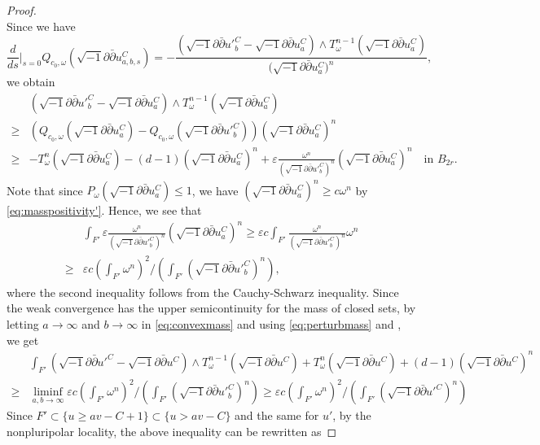 \documentclass{amsart}
\numberwithin{equation}{section}
\theoremstyle{plain}
\theoremstyle{definition}
\theoremstyle{remark}
\newcommand{\delb}{\sqrt{-1}\partial\bar{\partial}}
\begin{document}
\begin{proof}
\begin{equation*}
    \end{equation*}
    Since we have
    $$\frac{d}{ds}\Bigg\vert_{s=0} Q_{c_0,\omega}(\delb u^C_{a,b,s})=-\frac{(\delb u'^C_b-\delb u^C_a)\wedge T^{n-1}_\omega(\delb u^C_a)}{\big(\delb u^C_a\big)^n},$$
    we obtain
    \begin{equation}\label{eq:convexmass}
        \begin{aligned}
            &\left(\delb u'^C_b-\delb u^C_a\right)\wedge T^{n-1}_\omega(\delb u^C_a)\\
            \ge &\left(Q_{c_0,\omega}(\delb u^C_a)-Q_{c_0,\omega}(\delb u'^C_b)\right)(\delb u^C_a)^n \\ 
            \ge&-T^n_\omega(\delb u^C_a)-(d-1)(\delb u^C_a)^n+\varepsilon\frac{\omega^n}{(\delb u'^C_b)^n}(\delb u^C_a)^n\quad \text{in $B_{2r}$}.
        \end{aligned}
    \end{equation}
    Note that since $P_\omega(\delb u^C_a)\le1$, we have $(\delb u^C_a)^n\ge c\omega^n$ by \eqref{eq:masspositivity'}. 
    Hence, we see that 
    \begin{equation}\label{eq:perturbmass}
        \begin{aligned}
            &\int_{F'}\varepsilon\frac{\omega^n}{(\delb u'^C_b)^n}(\delb u^C_a)^n
        \ge\varepsilon c \int_{F'}\frac{\omega^n}{(\delb u'^C_b)^n}\omega^n\\
        \ge&\varepsilon c \left(\int_{F'}\omega^n\right)^2\Bigg/\left(\int_{F'}(\delb u'^C_b)^n\right),
        \end{aligned}
    \end{equation}
    where the second inequality follows from the Cauchy-Schwarz inequality. Since the weak convergence has the upper semicontinuity for the mass of closed sets, by letting $a\to\infty$ and $b\to\infty$ in \eqref{eq:convexmass} and using \eqref{eq:perturbmass} and \cite[Theorem 2.1]{BT}, we get
    \begin{equation*}
        \begin{aligned}
            &\int_{F'}\left(\delb u'^C-\delb u^C\right)\wedge T^{n-1}_\omega(\delb u^C)+T^n_\omega(\delb u^C)+(d-1)(\delb u^C)^n\\
            \ge&\liminf_{a,b\to\infty}\varepsilon c \left(\int_{F'}\omega^n\right)^2\Bigg/\left(\int_{F'}(\delb u'^C_b)^n\right)\ge\varepsilon c \left(\int_{F'}\omega^n\right)^2\Bigg/\left(\int_{F'}(\delb u'^C)^n\right)
        \end{aligned}
    \end{equation*}
    Since $F'\subset\{u\ge av-C+1\}\subset \{u>av-C\}$ and the same for $u'$, by the nonpluripolar locality, the above inequality can be rewritten as 

\end{proof}
\end{document}
